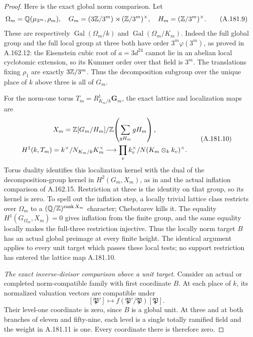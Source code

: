 \begin{proof}
Here is the exact global norm comparison.  Let
\[
 \Omega_m=\mathbb Q(\mu_{3^m},\rho_m),\quad
 G_m=(3\mathbb Z/3^m)\rtimes(\mathbb Z/3^m)^\times,
 \quad H_m=(\mathbb Z/3^m)^\times.
\tag{A.181.9}
\]
These are respectively \(\operatorname{Gal}(\Omega_m/k)\)
and \(\operatorname{Gal}(\Omega_m/K_m)\).
Indeed the full global group and the full local group at three
both have order \(3^m\varphi(3^m)\), as proved in
A.162.12: the Eisenstein cubic root of \(a=3d^{24}\)
cannot lie in an abelian local cyclotomic extension, so its
Kummer order over that field is \(3^m\).
The translations fixing \(\rho_1\) are exactly
\(3\mathbb Z/3^m\).  Thus the decomposition subgroup over the
unique place of \(k\) above three is all of \(G_m\).

For the norm-one torus \(T_m=R^1_{K_m/k}\mathbf G_m\),
the exact lattice and localization maps are
\[
\begin{gathered}
 X_m=\mathbb Z[G_m/H_m]/\mathbb Z\!\left(\sum_{gH_m}gH_m\right),\\
 H^1(k,T_m)=k^\times/N_{K_m/k}K_m^\times
  \longrightarrow\prod_v
      k_v^\times/N(K_m\otimes_k k_v)^\times.
\end{gathered}
\tag{A.181.10}
\]
Torus duality identifies this localization kernel with the dual
of the decomposition-group kernel in \(H^2(G_m,X_m)\),
as in \cite[Proposition 6.4]{BIR_Oki2026Norm} and the actual
inflation comparison of A.162.15.  Restriction at three is the
identity on that group, so its kernel is zero.  To spell out
the inflation step, a locally trivial lattice class restricts
over \(\Omega_m\) to a \((\mathbb Q/\mathbb Z)^{\operatorname{rank}X_m}\)
character; Chebotarev kills it.  The equality
\(H^1(G_{\Omega_m},X_m)=0\) gives inflation from the finite
group, and the same equality locally makes the full-three
restriction injective.  Thus the locally norm target \(B\)
has an actual global preimage at every finite height.
The identical argument applies to every unit target which
passes these local tests; no support restriction has entered
the lattice map A.181.10.



\emph{The exact inverse-divisor comparison above a unit target.}
Consider an actual or completed norm-compatible family with
first coordinate \(B\).  At each place of \(k\), its normalized
valuation vectors are compatible under
\[
       [\mathfrak P']\longmapsto
           f(\mathfrak P'/\mathfrak P)[\mathfrak P].
\tag{A.181.11}
\]
Their level-one coordinate is zero, since \(B\) is a global
unit.  At three and at both branches of eleven and fifty-nine,
each level is a single totally ramified field and the weight
in A.181.11 is one.  Every coordinate there is therefore zero.


\end{proof}
